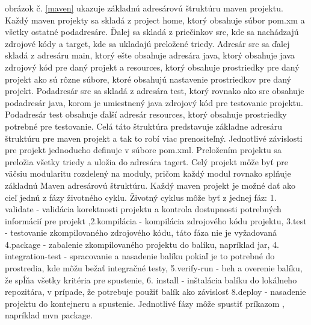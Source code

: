 obrázok č. \ref{maven} ukazuje základnú adresárovú štruktúru maven projektu. Každý maven projekty sa skladá z project home, ktorý obsahuje súbor pom.xm a všetky ostatné podadresáre. Ďalej sa skladá z priečinkov src, kde sa nachádzajú zdrojové kódy a target, kde sa ukladajú preložené triedy\cite{mavenbook}. Adresár src sa ďalej skladá z adresáru main, ktorý ešte obsahuje adresára java, ktorý obsahuje java zdrojový kód pre daný projekt a resources, ktorý obsahuje prostriedky pre daný projekt ako sú rôzne súbore, ktoré obsahujú nastavenie prostriedkov pre daný projekt. Podadresár src sa skladá z adresára test, ktorý rovnako ako src obsahuje podadresár java, korom je umiestnený java zdrojový kód pre testovanie projektu. Podadresár test obsahuje ďalší adresár resources, ktorý obsahuje prostriedky potrebné pre testovanie. Celá táto štruktúra predstavuje základne adresáru štruktúru pre maven projekt a tak to robí viac prenositeľný. Jednotlivé závislosti pre projekt jednoducho definuje v súbore pom.xml. Preložením projektu sa preložia všetky triedy a uložia do adresára tagert. Celý projekt môže byť pre väčsiu modularitu rozdelený na moduly, pričom každý modul rovnako splňuje základnú Maven adresárovú štruktúru. Každý maven projekt je možné dať ako cieľ jednú z fázy životného cyklu. Životný cyklus môže byť z jednej fáz: 1. validate - validácia korektnosti projektu a kontrola dostupnosti potrebných informácií pre projekt ,2.kompilácia - kompilácia zdrojového kódu projektu, 3.test - testovanie zkompilovaného zdrojového kódu, táto fáza nie je vyžadovaná 4.package - zabalenie zkompilovaného projektu do balíku, napríklad jar, 4. integration-test - spracovanie a nasadenie balíku pokiaľ je to potrebné do prostredia, kde môžu bežať integračné testy, 5.verify-run - beh a overenie balíku, že spĺňa všetky kritéria pre spustenie, 6. install - inštalácia balíku do lokálneho repozitára, v prípade, že potrebuje použiť balík ako závislosť 8.deploy - nasadenie projektu do kontejneru a spustenie.
Jednotlivé fázy môže spustiť príkazom , napríklad mvn package.


